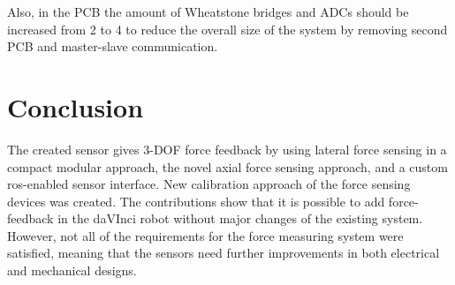    Also, in the PCB the amount of Wheatstone bridges and ADCs should be increased from 2 to 4 to reduce the overall size of the system by removing second PCB and master-slave communication.
	
\section{Conclusion}


The created sensor gives 3-DOF force feedback by using lateral force sensing in a compact modular approach, the novel axial force sensing approach, and a custom ros-enabled sensor interface. New calibration approach of the force sensing devices was created. The contributions show that it is possible to add force-feedback in the daVInci robot without major changes of the existing system. However, not all of the requirements for the force measuring system were satisfied, meaning that the sensors need further improvements in both electrical and mechanical designs.